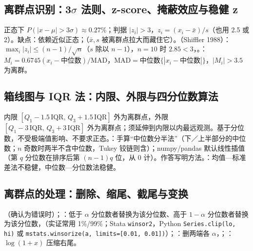 \subsection{\texorpdfstring{离群点识别：3$\sigma$ 法则、z-score、掩蔽效应与稳健 z}{离群点识别：3 sigma 法则、z-score、掩蔽效应与稳健 z}}
正态下 $P(|x-\mu|>3\sigma)\approx0.27\%$；判据 $|z_i|>3$，$z_i=(x_i-\bar x)/s$（也用 2.5 或 2）。缺点：依赖近似正态；（$\bar x,s$ 被离群点拉大而藏住它）。（Shiffler 1988）：$\max_i|z_i|\le(n-1)/\sqrt n$（$s$ 除以 $n-1$），$n=10$ 时 $2.85<3$，。：$M_i=0.6745(x_i-\text{中位数})/\mathrm{MAD}$，$\mathrm{MAD}=\text{中位数}\{|x_i-\text{中位数}|\}$，$|M_i|>3.5$ 为离群。

\subsection{箱线图与 IQR 法：内限、外限与四分位数算法}
内限 $[Q_1-1.5\,\mathrm{IQR},\,Q_3+1.5\,\mathrm{IQR}]$ 外为离群点，外限 $[Q_1-3\,\mathrm{IQR},\,Q_3+3\,\mathrm{IQR}]$ 外为离群点；须延伸到内限以内最远观测。基于分位数，不受极端值影响、不要求正态。：手算“中位数分半法”（下／上半部分的中位数；$n$ 奇数时两半不含中位数，Tukey 铰链则含）；numpy/pandas 默认线性插值（第 $q$ 分位数在排序后第 $(n-1)q$ 位，从 0 计）。作答写明方法。：均值—标准差法不稳健，中位数—分位数法稳健。

\subsection{离群点的处理：删除、缩尾、截尾与变换}
（确认为错误时）；：低于 $\alpha$ 分位数者替换为该分位数、高于 $1-\alpha$ 分位数者替换为该分位数，（实证常用 1\%/99\%；Stata \texttt{winsor2}，Python \texttt{Series.clip(lo, hi)} 或 \texttt{mstats.winsorize(a, limits=[0.01, 0.01])}）；：删两端各 $\alpha$，；：$\log(1+x)$ 压缩右尾。

